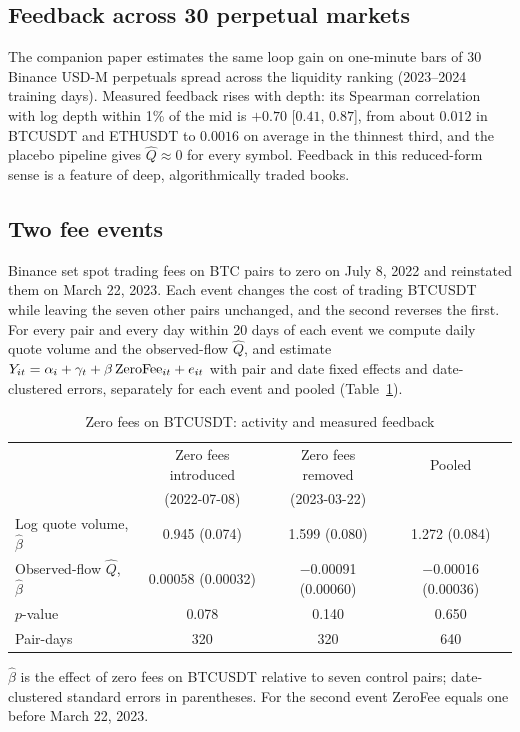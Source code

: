 \subsection{Feedback across 30 perpetual markets}

The companion paper estimates the same loop gain on one-minute bars of 30 Binance USD-M perpetuals spread across the liquidity ranking (2023--2024 training days). Measured feedback rises with depth: its Spearman correlation with log depth within 1\% of the mid is $+0.70$ [$0.41$, $0.87$], from about $0.012$ in BTCUSDT and ETHUSDT to $0.0016$ on average in the thinnest third, and the placebo pipeline gives $\hat Q\approx0$ for every symbol. Feedback in this reduced-form sense is a feature of deep, algorithmically traded books.

\subsection{Two fee events}

Binance set spot trading fees on BTC pairs to zero on July 8, 2022 and reinstated them on March 22, 2023. Each event changes the cost of trading BTCUSDT while leaving the seven other pairs unchanged, and the second reverses the first. For every pair and every day within 20 days of each event we compute daily quote volume and the observed-flow $\hat Q$, and estimate $Y_{it}=\alpha_i+\gamma_t+\beta\,{\rm ZeroFee}_{it}+e_{it}$ with pair and date fixed effects and date-clustered errors, separately for each event and pooled (Table~\ref{tab:fee2}).

\begin{table}[t]\centering\small
\begin{threeparttable}
\caption{Zero fees on BTCUSDT: activity and measured feedback}\label{tab:fee2}
\begin{tabular}{lccc}
\toprule
 & Zero fees introduced & Zero fees removed & Pooled\\
 & (2022-07-08) & (2023-03-22) & \\
\midrule
Log quote volume, $\hat\beta$ & 0.945 (0.074) & 1.599 (0.080) & 1.272 (0.084)\\
Observed-flow $\hat Q$, $\hat\beta$ & 0.00058 (0.00032) & $-$0.00091 (0.00060) & $-$0.00016 (0.00036)\\
\quad $p$-value & 0.078 & 0.140 & 0.650\\
Pair-days & 320 & 320 & 640\\
\bottomrule
\end{tabular}
\begin{tablenotes}\footnotesize\item $\hat\beta$ is the effect of zero fees on BTCUSDT relative to seven control pairs; date-clustered standard errors in parentheses. For the second event ZeroFee equals one before March 22, 2023. \end{tablenotes}
\end{threeparttable}
\end{table}

